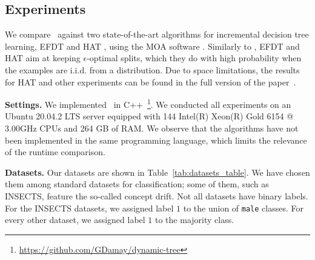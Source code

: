 \subsection{Experiments}
We compare \algo\ against two state-of-the-art algorithms for incremental decision tree learning, EFDT \cite{Manapragada2018_EFDT} and HAT \cite{bifet2009_AdaptiveLearning}, using the MOA software \cite{Bifet2010_MOA}. Similarly to \algo, EFDT and HAT aim at keeping $\epsilon$-optimal splits, which they do with high probability when the examples are i.i.d. from a distribution.
Due to space limitations, the results for HAT and other experiments can be found in the full version of the paper~\cite{BDS22arxiv}.  

\noindent\textbf{Settings.} We implemented \algo\ in C++~\footnote{\url{https://github.com/GDamay/dynamic-tree}}. We conducted all experiments on an Ubuntu 20.04.2 LTS server equipped with 144 Intel(R) Xeon(R) Gold 6154 @ 3.00GHz CPUs and 264 GB of RAM. We observe that the algorithms have not been implemented in the same programming language, which limits the relevance of the runtime comparison.

\noindent\textbf{Datasets.} Our datasets are shown in Table~\ref{tab:datasets_table}. We have chosen them among standard datasets for classification; some of them, such as INSECTS, feature the so-called concept drift. Not all datasets have binary labels. For the INSECTS datasets, we assigned label $1$ to  the union of \texttt{male} classes. For every other dataset, we assigned label $1$ to the majority class. %


